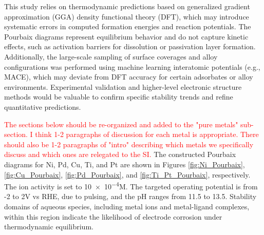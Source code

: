 \documentclass[journal=jacsat,manuscript=article]{achemso}
\begin{document}
This study relies on thermodynamic predictions based on generalized gradient approximation (GGA) density functional theory (DFT), which may introduce systematic errors in computed formation energies and reaction potentials. The Pourbaix diagrams represent equilibrium behavior and do not capture kinetic effects, such as activation barriers for dissolution or passivation layer formation. Additionally, the large-scale sampling of surface coverages and alloy configurations was performed using machine learning interatomic potentials (e.g., MACE), which may deviate from DFT accuracy for certain adsorbates or alloy environments. Experimental validation and higher-level electronic structure methods would be valuable to confirm specific stability trends and refine quantitative predictions.



\textcolor{red}{The sections below should be re-organized and added to the "pure metals" sub-section. I think 1-2 paragraphs of discussion for each metal is appropriate. There should also be 1-2 paragraphs of "intro" describing which metals we specifically discuss and which ones are relegated to the SI.}
The constructed Pourbaix diagrams for Ni, Pd, Cu, Ti, and Pt are shown in Figures \ref{fig:Ni_Pourbaix}, \ref{fig:Cu_Pourbaix}, \ref{fig:Pd_Pourbaix}, and \ref{fig:Ti_Pt_Pourbaix}, respectively. The ion activity is set to \num{10e-4}M. The targeted operating potential is from -2 to 2V vs RHE, due to pulsing, and the pH ranges from 11.5 to 13.5. Stability domains of aqueous species, including metal ions and metal-ligand complexes, within this region indicate the likelihood of electrode corrosion under thermodynamic equilibrium. 
\end{document}
